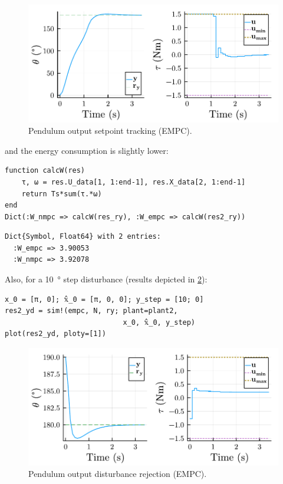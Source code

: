 \begin{figure}[h]
    \centering
    \includegraphics[width=\columnwidth]{fig/plot_EconomMPC1.pdf}
    \caption{Pendulum output setpoint tracking (EMPC).}\label{fig:plot_EconomMPC1}
\end{figure}

\noindent and the energy consumption is slightly lower:
\begin{verbatim}
function calcW(res)
    τ, ω = res.U_data[1, 1:end-1], res.X_data[2, 1:end-1]
    return Ts*sum(τ.*ω)
end
Dict(:W_nmpc => calcW(res_ry), :W_empc => calcW(res2_ry))
\end{verbatim}
\spacerepl\vspace{1pt}
\begin{verbatim}
Dict{Symbol, Float64} with 2 entries:
  :W_empc => 3.90053
  :W_nmpc => 3.92078
\end{verbatim}

\noindent Also, for a \SI{10}{\degree} step disturbance (results depicted in \cref{fig:plot_EconomMPC2}):
\begin{verbatim}
x_0 = [π, 0]; 𝕩̂_0 = [π, 0, 0]; y_step = [10; 0]
res2_yd = sim!(empc, N, ry; plant=plant2, 
                            x_0, 𝕩̂_0, y_step)
plot(res2_yd, ploty=[1])
\end{verbatim}

\begin{figure}[h]
    \centering
    \includegraphics[width=\columnwidth]{fig/plot_EconomMPC2.pdf}
    \caption{Pendulum output disturbance rejection (EMPC).}\label{fig:plot_EconomMPC2}
\end{figure}

